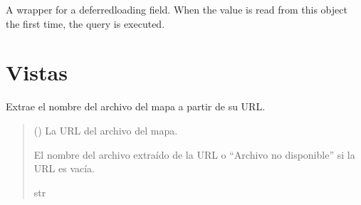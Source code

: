 \documentclass[letterpaper,10pt,spanish]{sphinxmanual}
\begin{document}
\begin{fulllineitems}
\begin{fulllineitems}
\end{fulllineitems}



\begin{fulllineitems}

\pysigstartsignatures
{}
\pysigstopsignatures
\sphinxAtStartPar
A wrapper for a deferred\sphinxhyphen{}loading field. When the value is read from this
object the first time, the query is executed.

\end{fulllineitems}


\end{fulllineitems}



\section{Vistas}
\label{\detokenize{mapoteca:vistas}}

\begin{fulllineitems}

\pysigstartsignatures
{}
\pysigstopsignatures
\sphinxAtStartPar
Extrae el nombre del archivo del mapa a partir de su URL.
\begin{quote}\begin{description}
\sphinxAtStartPar
{} () \textendash{} La URL del archivo del mapa.

\sphinxAtStartPar
El nombre del archivo extraído de la URL o “Archivo no disponible” si la URL es vacía.

\sphinxAtStartPar
str

\end{description}\end{quote}

\end{fulllineitems}
\end{document}
